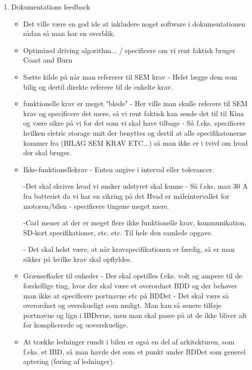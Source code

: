 \begin{enumerate}
		\item Dokumentations feedback
		
		\begin{itemize}
			\item Det ville være en god ide at inkludere noget software i dokumentationen sådan så man har en overblik. 
			\item Optimized driving algorithm... / specificere om vi rent faktisk bruger Coast and Burn
			
			\item Sætte kilde på når man refererer til SEM krav - Helst lægge dem som bilig og dertil direkte referere til de enkelte krav. 
			
			\item funktionelle krav er meget "bløde" - Her ville man skulle referere til SEM krav og specificere det mere, så vi rent faktisk kan sende det til til Kina og være sikre på vi for det som vi skal have tilbage - Så f.eks. specificere hvilken eletric storage unit der benyttes og dertil at alle specifikatonerne kommer fra (BILAG SEM KRAV ETC...) så man ikke er i tvivl om hvad der skal bruges.
			
			\item Ikke-funktionellekrav - Enten angive i interval eller tolerancer.
			
			-Det skal skrives hvad vi ønsker udstyret skal kunne - Så f.eks. max 30 A fra batteriet da vi har en sikring på det 
			Hvad er måleintervallet for motoren/bilen - specificere tingene meget mere.
			
			-Carl mener at der er meget flere ikke funktionelle krav, kommunikation, SD-kort specifikationer, etc. etc. Til hele den samlede opgave. 
			
			- Det skal helst være, at når kravspecifikationen er færdig, så er man sikker på hvilke krav skal opflyldes.
			
			\item Grænseflader til enheder - Der skal opstilles f.eks. volt og ampere til de forskellige ting, hvor der skal være et overordnet BDD og der behøver man ikke at specificere portnavne etc på BDDet - Det skal være så overordnet og overskueligt som muligt. Man kan så senere tilføje portnavne og lign i IBDerne, men man skal passe på at de ikke bliver alt for komplicerede og uoverskuelige. 
			
			\item At trække ledninger rundt i bilen er også en del af arkitekturen, som f.eks. et IBD, så man havde det som et punkt under BDDet som generel aptering (føring af ledninger). 
			

\end{itemize}
\end{enumerate}
